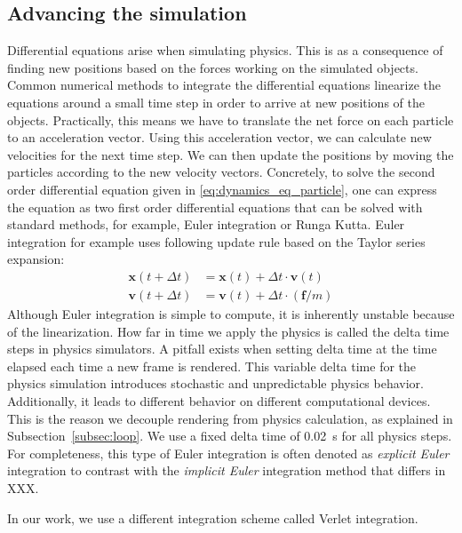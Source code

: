 \documentclass[\home/main.tex]{subfiles}
\begin{document}
\subsection{Advancing the simulation}
Differential equations arise when simulating physics. This is as a consequence of finding new positions based on the forces working on the simulated objects. Common numerical methods to integrate the differential equations linearize the equations around a small time step in order to arrive at new positions of the objects.
Practically, this means we have to translate the net force on each particle to an acceleration vector. Using this acceleration vector, we can calculate new velocities for the next time step. We can then update the positions by moving the particles according to the new velocity vectors.
Concretely, to solve the second order differential equation given in \cref{eq:dynamics_eq_particle}, one can express the equation as two first order differential equations that can be solved with standard methods, for example, Euler integration or Runga Kutta. Euler integration for example uses following update rule based on the Taylor series expansion:
\begin{equation}
    \begin{aligned}
    \mathbf{x}(t+\Delta t) &=\mathbf{x}(t)+\Delta t \cdot \mathbf{v}(t) \\
    \mathbf{v}(t+\Delta t) &=\mathbf{v}(t)+\Delta t \cdot(\mathbf{f} / m)
    \end{aligned}
\end{equation}
Although Euler integration is simple to compute, it is inherently unstable because of the linearization.
How far in time we apply the physics is called the delta time steps in physics simulators. A pitfall exists when setting delta time at the time elapsed each time a new frame is rendered. This variable delta time for the physics simulation introduces stochastic and unpredictable physics behavior. Additionally, it leads to different behavior on different computational devices. This is the reason we decouple rendering from physics calculation, as explained in Subsection~\ref{subsec:loop}. We use a fixed delta time of \qty{0.02}{\second} for all physics steps. 
For completeness, this type of Euler integration is often denoted as \emph{explicit Euler} integration to contrast with the \emph{implicit Euler} integration method that differs in XXX. 

In our work, we use a different integration scheme called Verlet integration. 
\end{document}
